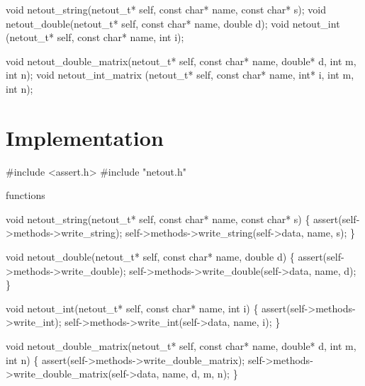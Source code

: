 \nwenddocs{}\endmoddef
void netout_string(netout_t* self, const char* name, const char* s);
void netout_double(netout_t* self, const char* name, double d);
void netout_int   (netout_t* self, const char* name, int i);
\nwendcode{}\nwdocspar

\nwenddocs{}\plusendmoddef
void netout_double_matrix(netout_t* self, const char* name,
                          double* d, int m, int n);
void netout_int_matrix   (netout_t* self, const char* name,
                          int* i, int m, int n);
\nwendcode{}\nwdocspar


\section{Implementation}

\nwenddocs{}\endmoddef
#include <assert.h>
#include "netout.h"

\LA{}functions~{\nwtagstyle{}}\RA{}
\nwendcode{}\nwdocspar

\nwenddocs{}\endmoddef
void netout_string(netout_t* self, const char* name, const char* s)
\{
    assert(self->methods->write_string);
    self->methods->write_string(self->data, name, s);
\}

void netout_double(netout_t* self, const char* name, double d)
\{
    assert(self->methods->write_double);
    self->methods->write_double(self->data, name, d);
\}

void netout_int(netout_t* self, const char* name, int i)
\{
    assert(self->methods->write_int);
    self->methods->write_int(self->data, name, i);
\}

void netout_double_matrix(netout_t* self, const char* name,
                          double* d, int m, int n)
\{
    assert(self->methods->write_double_matrix);
    self->methods->write_double_matrix(self->data, name, d, m, n);
\}

